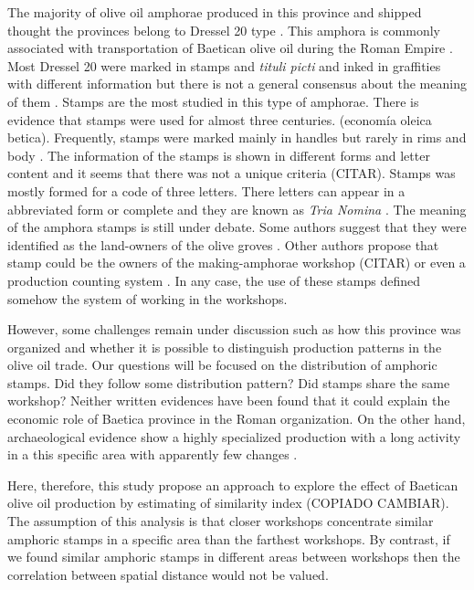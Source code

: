 \documentclass[review]{elsarticle}
\begin{document}
The majority of olive oil amphorae produced in this province and shipped thought the provinces belong to Dressel 20 type \citep{dressel,martin-kilcher_romischen_1994}. This amphora is commonly associated with transportation of Baetican olive oil during the Roman Empire \citep{berni_millet_epigrafianforica_2008}. Most Dressel 20 were marked in stamps and \textit{tituli picti} and inked in graffities with different information but there is not a general consensus about the meaning of them \citep{rodriguez_baetican_1998}. Stamps are the most studied in this type of amphorae. There is evidence that stamps were used for almost three centuries. (economía oleica betica). Frequently, stamps were marked mainly in handles but rarely in rims and body \citep{millet_anforas_1998}. 
The information of the stamps is shown in different forms and letter content and it seems that there was not a unique criteria (CITAR). Stamps was mostly formed for a code of three letters. There letters can appear in a abbreviated form or complete and they are known as \textit{Tria Nomina} \citep{berni_millet_amphora_1996}. 
The meaning of the amphora stamps is still under debate. Some authors suggest that they were identified as the land-owners of the olive groves \citep{rodriguez_economioleicola_1977}. Other authors propose that stamp could be the owners of the making-amphorae workshop (CITAR) or even a production counting system \citep{berni_millet_epigrafianforica_2008}. In any case, the use of these stamps defined somehow the system of working in the workshops. 

However, some challenges remain under discussion such as how this province was organized and whether it is possible to distinguish production patterns in the olive oil trade. Our questions will be focused on the distribution of amphoric stamps. Did they follow some distribution pattern? Did stamps share the same workshop? Neither written evidences have been found that it could explain the economic role of Baetica province in the Roman organization. On the other hand, archaeological evidence show a highly specialized production with a long activity in a this specific area with apparently few changes \citep{remesal_anforas_2004}. 


Here, therefore, this study propose an approach to explore the effect of Baetican olive oil production by estimating of similarity index (COPIADO CAMBIAR). The assumption of this analysis is that closer workshops concentrate similar amphoric stamps in a specific area than the farthest workshops. By contrast, if we found similar amphoric stamps in different areas between workshops then the correlation between spatial distance would not be valued.  
\end{document}
